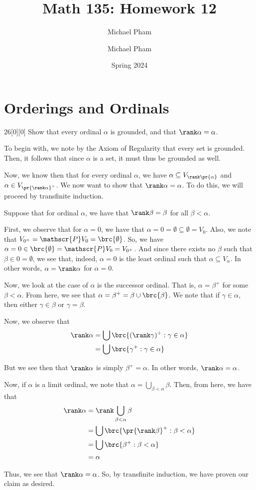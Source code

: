 \documentclass{article}
\title{#1}
\author{Michael Pham}
\date{#2}
\renewcommand{\mytitle}[2]{%
	\title{#1}
	\author{Michael Pham}
	\date{#2}
	\maketitle
	\newpage
	\listoftheorems
	\newpage
}
\begin{document}
\mytitle{Math 135: Homework 12}{Spring 2024}

\setcounter{section}{6}
\section{Orderings and Ordinals}
\begin{hw}{26}[0][0]
	Show that every ordinal $\alpha$ is grounded, and that $\rank \alpha = \alpha$.
\end{hw}
\begin{solution}
	To begin with, we note by the Axiom of Regularity that every set is grounded. Then, it follows that since $\alpha$ is a set, it must thus be grounded as well.
	
	Now, we know then that for every ordinal $\alpha$, we have $\alpha \subseteq V_{\rank\pr{\alpha}}$ and $\alpha \in V_{ \pr{\rank \alpha}^{+}}$. We now want to show that $\rank \alpha = \alpha$. To do this, we will proceed by transfinite induction.
	
	Suppose that for ordinal $\alpha$, we have that $\rank \beta = \beta$ for all $\beta < \alpha$.
	
	First, we observe that for $\alpha = 0$, we have that $\alpha = 0 = \emptyset \subseteq \emptyset = V_0$. Also, we note that $V_{0^{+}} = \mathscr{P} V_0 = \brc{\emptyset}$. So, we have $\alpha = 0 \in \brc{\emptyset} = \mathscr{P} V_0 = V_{0^{+}}$. And since there exists no $\beta$ such that $\beta \in 0 = \emptyset$, we see that, indeed, $\alpha = 0$ is the least ordinal such that $\alpha \subseteq V_\alpha$. In other words, $\alpha = \rank \alpha$ for $\alpha = 0$.
	
	Now, we look at the case of $\alpha$ is the successor ordinal. That is, $\alpha = \beta^{+}$ for some $\beta < \alpha$. From here, we see that $\alpha = \beta^{+} = \beta \cup \brc{\beta}$.	We note that if $\gamma \in \alpha$, then either $\gamma \in \beta$ or $\gamma = \beta$.
	
	Now, we observe that
	\begin{align*}
		\rank \alpha &= \bigcup \brc{(\rank \gamma)^{+} : \gamma \in \alpha} \\
		&= \bigcup \brc{\gamma^{+} : \gamma \in \alpha}
	\end{align*}

 	But we see then that $\rank \alpha$ is simply $\beta^{+} = \alpha$. In other words, $\rank \alpha = \alpha$.
	
	Now, if $\alpha$ is a limit ordinal, we note that $\alpha = \bigcup_{\beta < \alpha} \beta$. Then, from here, we have that
	\begin{align*}
		\rank \alpha &= \rank \bigcup_{\beta < \alpha} \beta \\
		&= \bigcup \brc{\pr{\rank \beta}^{+} : \beta < \alpha} \\
		&= \bigcup \brc{\beta^{+} : \beta < \alpha} \\
		&= \alpha
	\end{align*}

	Thus, we see that $\rank \alpha = \alpha$. So, by transfinite induction, we have proven our claim as desired.
\end{solution}
\end{document}
